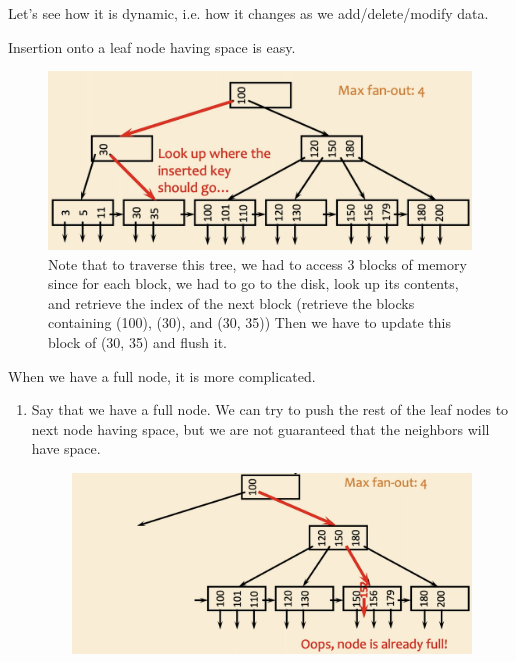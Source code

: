 \documentclass{article}
\begin{document}
    Let's see how it is dynamic, i.e. how it changes as we add/delete/modify data. 

    \begin{definition}[Insertion]
      Insertion onto a leaf node having space is easy. 
      
      \begin{figure}[H]
        \centering 
        \includegraphics[scale=0.4]{img/insertion_easy.png}
        \caption{Note that to traverse this tree, we had to access 3 blocks of memory since for each block, we had to go to the disk, look up its contents, and retrieve the index of the next block (retrieve the blocks containing (100), (30), and (30, 35)) Then we have to update this block of (30, 35) and flush it. }
        \label{fig:insertion_easy}
      \end{figure}

      When we have a full node, it is more complicated. 
      \begin{enumerate}
        \item Say that we have a full node. We can try to push the rest of the leaf nodes to next node having space, but we are not guaranteed that the neighbors will have space. 

        \begin{figure}[H]
          \centering 
          \includegraphics[scale=0.4]{img/insertion_1.png}
          \caption{} 
          \label{fig:insertion_1}
        \end{figure}


\end{enumerate}
\end{definition}
\end{document}
